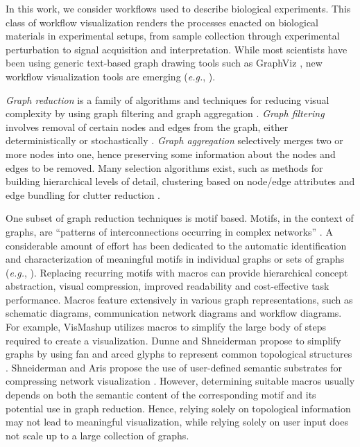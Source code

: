 In this work, we consider workflows used to describe biological experiments.
This class of workflow visualization renders the processes
enacted on biological materials in experimental setups, from sample collection through experimental perturbation to signal acquisition and interpretation.
While most scientists have been using generic text-based graph
drawing tools such as GraphViz \cite{GraphViz::2012}, new workflow visualization tools
are emerging (\emph{e.g.}, \cite{Maguire:2012:TVCG}). 

\emph{Graph reduction} is a family of algorithms and techniques for reducing visual complexity by using graph filtering and graph aggregation \cite{landesberger11}.
\emph{Graph filtering} involves removal of certain nodes and edges from the graph, either deterministically or stochastically \cite{leskovec06,landesberger11}.
\emph{Graph aggregation} selectively merges two or more nodes into one, hence preserving some information about the nodes and edges to be removed.
Many selection algorithms exist, such as methods for building hierarchical levels of detail, clustering based on node/edge attributes and edge bundling for clutter reduction \cite{landesberger11,holten06}.

One subset of graph reduction techniques is motif based.
Motifs, in the context of graphs, are ``patterns of interconnections occurring in complex networks'' \cite{Milo:2002,Pavlopoulos:2011}.
A considerable amount of effort has been dedicated to the automatic identification and characterization of meaningful motifs in individual graphs or sets of graphs (\emph{e.g.}, \cite{kashtan04,maayan09,wernicke06,schreiber05,landesberger09,kuramochi05, dunnemotif2012}).
Replacing recurring motifs with macros can provide hierarchical concept abstraction, visual compression, improved readability and cost-effective task performance.
Macros feature extensively in various graph representations, such as schematic diagrams, communication network diagrams and workflow diagrams.
For example, VisMashup \cite{santosvismashup:2009} utilizes macros to simplify the large body of steps required to create a visualization.
Dunne and Shneiderman propose to simplify graphs by using fan and arced glyphs to represent common topological structures \cite{dunnemotif2012}.
Shneiderman and Aris propose the use of user-defined semantic substrates for compressing network visualization \cite{Shneiderman:2006:TVCG}. 
However, determining suitable macros usually depends on both the semantic content of the corresponding motif and its potential use in graph reduction.
Hence, relying solely on topological information may not lead to meaningful visualization, while relying solely on user input does not scale up to a large collection of graphs.

